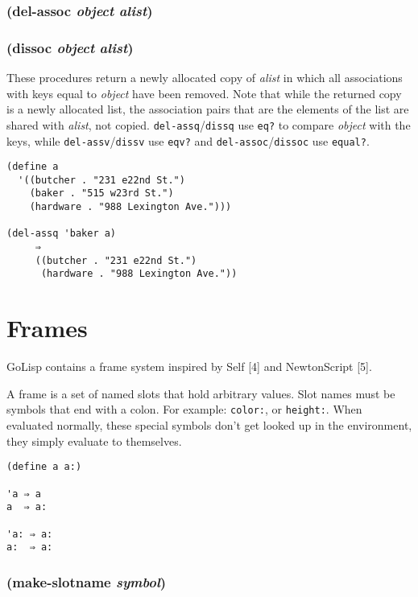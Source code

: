 \documentclass{article}
\begin{document}
\subsubsection{(del-assoc \emph{object} \emph{alist})}

\subsubsection{(dissoc \emph{object} \emph{alist})}

These procedures return a newly allocated copy of \emph{alist} in which all associations with
keys equal to \emph{object} have been removed. Note that while the returned copy is a newly
allocated list, the association pairs that are the elements of the list are shared with
\emph{alist}, not copied. \verb|del-assq|/\verb|dissq| use \verb|eq?| to compare
\emph{object} with the keys, while \verb|del-assv|/\verb|dissv| use \verb|eqv?| and
\verb|del-assoc|/\verb|dissoc| use \verb|equal?|.

\begin{verbatim}
(define a
  '((butcher . "231 e22nd St.")
    (baker . "515 w23rd St.")
    (hardware . "988 Lexington Ave.")))

(del-assq 'baker a)
     ⇒
     ((butcher . "231 e22nd St.")
      (hardware . "988 Lexington Ave."))
\end{verbatim}

\section{Frames}\label{sec:frames}

GoLisp contains a frame system inspired by Self [4] and NewtonScript [5].

A frame is a set of named slots that hold arbitrary values. Slot names must be symbols that
end with a colon. For example: \verb|color:|, or \verb|height:|. When evaluated normally,
these special symbols don’t get looked up in the environment, they simply evaluate to
themselves.

\begin{verbatim}
(define a a:)

'a ⇒ a
a  ⇒ a:

'a: ⇒ a:
a:  ⇒ a:
\end{verbatim}

\subsubsection{(make-slotname \emph{symbol})}
\end{document}
